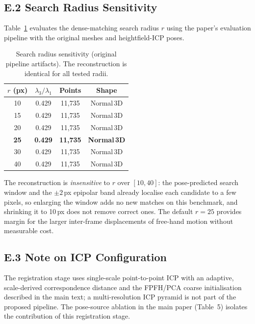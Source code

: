 \documentclass[review]{elsarticle}
\begin{document}
\subsection*{E.2 Search Radius Sensitivity}

Table~\ref{tab:supp_search_radius} evaluates the dense-matching search radius $r$ using the paper's evaluation pipeline with the original meshes and heightfield-ICP poses.

\begin{table}[h]
\centering
\caption{Search radius sensitivity (original pipeline artifacts). The reconstruction is identical for all tested radii.}
\label{tab:supp_search_radius}
\setlength{\tabcolsep}{4pt}
\renewcommand{\arraystretch}{1.05}
\begin{tabular}{cccc}
\toprule
$r$ (px) & $\lambda_3/\lambda_1$ & Points & Shape \\
\midrule
10 & 0.429 & 11{,}735 & Normal\,3D \\
15 & 0.429 & 11{,}735 & Normal\,3D \\
20 & 0.429 & 11{,}735 & Normal\,3D \\
\textbf{25} & \textbf{0.429} & \textbf{11{,}735} & \textbf{Normal\,3D} \\
30 & 0.429 & 11{,}735 & Normal\,3D \\
40 & 0.429 & 11{,}735 & Normal\,3D \\
\bottomrule
\end{tabular}
\end{table}

The reconstruction is \emph{insensitive} to $r$ over $[10, 40]$: the pose-predicted search window and the $\pm 2$\,px epipolar band already localise each candidate to a few pixels, so enlarging the window adds no new matches on this benchmark, and shrinking it to 10\,px does not remove correct ones. The default $r{=}25$ provides margin for the larger inter-frame displacements of free-hand motion without measurable cost.

\subsection*{E.3 Note on ICP Configuration}

The registration stage uses single-scale point-to-point ICP with an adaptive, scale-derived correspondence distance and the FPFH/PCA coarse initialisation described in the main text; a multi-resolution ICP pyramid is not part of the proposed pipeline. The pose-source ablation in the main paper (Table~5) isolates the contribution of this registration stage.
\end{document}
